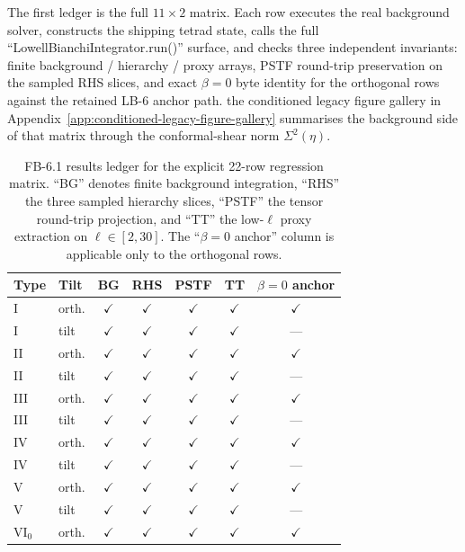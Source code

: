 The first ledger is the full $11 \times 2$ matrix.  Each row executes
the real background solver, constructs the shipping tetrad state, calls
the full ``LowellBianchiIntegrator.run()'' surface, and checks three
independent invariants: finite background / hierarchy / proxy arrays,
PSTF round-trip preservation on the sampled RHS slices, and exact
$\beta = 0$ byte identity for the orthogonal rows against the retained
LB-6 anchor path.  the conditioned legacy figure gallery in Appendix~\ref{app:conditioned-legacy-figure-gallery} summarises the
background side of that matrix through the conformal-shear norm
$\Sigma^2(\eta)$.

\begin{table}[p]
\caption{FB-6.1 results ledger for the explicit 22-row regression
matrix.  ``BG'' denotes finite background integration, ``RHS'' the
three sampled hierarchy slices, ``PSTF'' the tensor round-trip
projection, and ``TT'' the low-$\ell$ proxy extraction on
$\ell \in [2,30]$.  The ``$\beta = 0$ anchor'' column is applicable
only to the orthogonal rows.}
\label{tab:fb6_matrix}
\centering
\scriptsize
\begin{tabular}{llccccc}
\hline\hline
Type & Tilt & BG & RHS & PSTF & TT & $\beta = 0$ anchor \\
\hline
I      & orth. & $\checkmark$ & $\checkmark$ & $\checkmark$ & $\checkmark$ & $\checkmark$ \\
I      & tilt  & $\checkmark$ & $\checkmark$ & $\checkmark$ & $\checkmark$ & --- \\
II     & orth. & $\checkmark$ & $\checkmark$ & $\checkmark$ & $\checkmark$ & $\checkmark$ \\
II     & tilt  & $\checkmark$ & $\checkmark$ & $\checkmark$ & $\checkmark$ & --- \\
III    & orth. & $\checkmark$ & $\checkmark$ & $\checkmark$ & $\checkmark$ & $\checkmark$ \\
III    & tilt  & $\checkmark$ & $\checkmark$ & $\checkmark$ & $\checkmark$ & --- \\
IV     & orth. & $\checkmark$ & $\checkmark$ & $\checkmark$ & $\checkmark$ & $\checkmark$ \\
IV     & tilt  & $\checkmark$ & $\checkmark$ & $\checkmark$ & $\checkmark$ & --- \\
V      & orth. & $\checkmark$ & $\checkmark$ & $\checkmark$ & $\checkmark$ & $\checkmark$ \\
V      & tilt  & $\checkmark$ & $\checkmark$ & $\checkmark$ & $\checkmark$ & --- \\
VI$_0$ & orth. & $\checkmark$ & $\checkmark$ & $\checkmark$ & $\checkmark$ & $\checkmark$ \\

\end{tabular}
\end{table}
